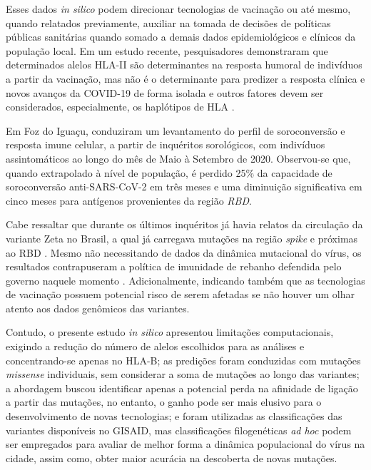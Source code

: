 \begin{justifying}
Esses dados \textit{in silico} podem direcionar tecnologias de vacinação ou até mesmo, quando relatados previamente, auxiliar na tomada de decisões de políticas públicas sanitárias quando somado a demais dados epidemiológicos e clínicos da população local. Em um estudo recente, pesquisadores demonstraram que determinados alelos HLA-II são determinantes na resposta humoral de indivíduos a partir da vacinação, mas não é o determinante para predizer a resposta clínica e novos avanços da COVID-19 de forma isolada e outros fatores devem ser considerados, especialmente, os haplótipos de HLA \cite{Olafsdottir:2022}. 

Em Foz do Iguaçu,   conduziram um levantamento do perfil de soroconversão e resposta imune celular, a partir de inquéritos sorológicos, com indivíduos assintomáticos ao longo do mês de Maio à Setembro de 2020. Observou-se que, quando extrapolado à nível de população, é perdido 25\% da capacidade de soroconversão anti-SARS-CoV-2 em três meses e uma diminuição significativa em cinco meses para antígenos provenientes da região \textit{RBD}. 

Cabe ressaltar que durante os últimos inquéritos já havia relatos da circulação da variante Zeta no Brasil, a qual já carregava mutações na região \textit{spike} e próximas ao RBD \cite{Giovanetti:2022}. Mesmo não necessitando de dados da dinâmica mutacional do vírus, os resultados contrapuseram a política de imunidade de rebanho defendida pelo governo naquele momento \cite{Gurgel:2021, unila:2020}. Adicionalmente, indicando também que as tecnologias de vacinação possuem potencial risco de serem afetadas se não houver um olhar atento aos dados genômicos das variantes.

Contudo, o presente estudo \textit{in silico} apresentou limitações computacionais, exigindo a redução do número de alelos escolhidos para as análises e concentrando-se apenas no HLA-B; as predições foram conduzidas com mutações \textit{missense} individuais, sem considerar a soma de mutações ao longo das variantes; a abordagem buscou identificar apenas a potencial perda na afinidade de ligação a partir das mutações, no entanto, o ganho pode ser mais elusivo para o desenvolvimento de novas tecnologias; e  foram utilizadas as classificações das variantes disponíveis no GISAID, mas classificações filogenéticas \textit{ad hoc} podem ser empregados para avaliar de melhor forma a dinâmica populacional do vírus na cidade, assim como, obter maior acurácia na descoberta de novas mutações.

\end{justifying}


